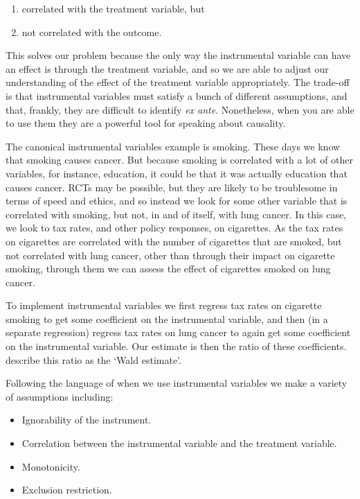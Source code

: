 \documentclass[
]{book}
\providecommand{\tightlist}{%
  \setlength{\itemsep}{0pt}\setlength{\parskip}{0pt}}
\begin{document}
\begin{enumerate}
\def\labelenumi{\arabic{enumi}.}
\tightlist
\item
  correlated with the treatment variable, but
\item
  not correlated with the outcome.
\end{enumerate}

This solves our problem because the only way the instrumental variable can have an effect is through the treatment variable, and so we are able to adjust our understanding of the effect of the treatment variable appropriately. The trade-off is that instrumental variables must satisfy a bunch of different assumptions, and that, frankly, they are difficult to identify \emph{ex ante}. Nonetheless, when you are able to use them they are a powerful tool for speaking about causality.

The canonical instrumental variables example is smoking. These days we know that smoking causes cancer. But because smoking is correlated with a lot of other variables, for instance, education, it could be that it was actually education that causes cancer. RCTs may be possible, but they are likely to be troublesome in terms of speed and ethics, and so instead we look for some other variable that is correlated with smoking, but not, in and of itself, with lung cancer. In this case, we look to tax rates, and other policy responses, on cigarettes. As the tax rates on cigarettes are correlated with the number of cigarettes that are smoked, but not correlated with lung cancer, other than through their impact on cigarette smoking, through them we can assess the effect of cigarettes smoked on lung cancer.

To implement instrumental variables we first regress tax rates on cigarette smoking to get some coefficient on the instrumental variable, and then (in a separate regression) regress tax rates on lung cancer to again get some coefficient on the instrumental variable. Our estimate is then the ratio of these coefficients. \citep[p.~219]{gelmanandhill} describe this ratio as the `Wald estimate'.

Following the language of \citep[p.~216]{gelmanandhill} when we use instrumental variables we make a variety of assumptions including:

\begin{itemize}
\tightlist
\item
  Ignorability of the instrument.
\item
  Correlation between the instrumental variable and the treatment variable.
\item
  Monotonicity.
\item
  Exclusion restriction.
\end{itemize}
\end{document}
